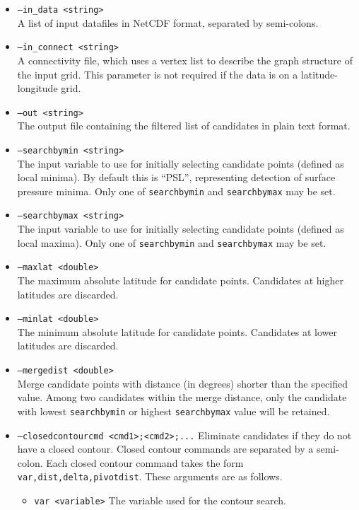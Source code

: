 \documentclass[gmdd, hvmath, online]{copernicus_discussions}
\begin{document}
\begin{itemize}
\item[] \texttt{--in\_data <string>} \\ A list of input datafiles in NetCDF format, separated by semi-colons.
\item[] \texttt{--in\_connect <string>} \\ A connectivity file, which uses a vertex list to describe the graph structure of the input grid.  This parameter is not required if the data is on a latitude-longitude grid.
\item[] \texttt{--out <string>} \\ The output file containing the filtered list of candidates in plain text format.
\item[] \texttt{--searchbymin <string>} \\ The input variable to use for initially selecting candidate points (defined as local minima).  By default this is ``PSL'', representing detection of surface pressure minima.  Only one of \texttt{searchbymin} and \texttt{searchbymax} may be set.
\item[] \texttt{--searchbymax <string>} \\ The input variable to use for initially selecting candidate points (defined as local maxima).  Only one of \texttt{searchbymin} and \texttt{searchbymax} may be set.
\item[] \texttt{--maxlat <double>} \\ The maximum absolute latitude for candidate points.  Candidates at higher latitudes are discarded.
\item[] \texttt{--minlat <double>} \\ The minimum absolute latitude for candidate points.  Candidates at lower latitudes are discarded.
\item[] \texttt{--mergedist <double>} \\ Merge candidate points with distance (in degrees) shorter than the specified value.  Among two candidates within the merge distance, only the candidate with lowest \texttt{searchbymin} or highest \texttt{searchbymax} value will be retained. 
\item[] \texttt{--closedcontourcmd <cmd1>;<cmd2>;...} Eliminate candidates if they do not have a closed contour.  Closed contour commands are separated by a semi-colon.  Each closed contour command takes the form \texttt{var,dist,delta,pivotdist}.  These arguments are as follows.
\begin{itemize}
\item[] \texttt{var <variable>}  The variable used for the contour search.

\end{itemize}
\end{itemize}
\end{document}
